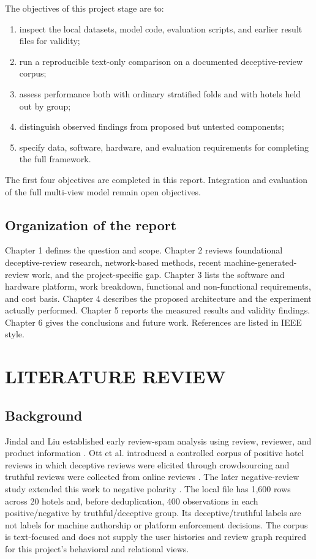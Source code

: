\documentclass[12pt,a4paper]{report}
\begin{document}
The objectives of this project stage are to:

\begin{enumerate}
    \item inspect the local datasets, model code, evaluation scripts, and earlier result files for validity;
    \item run a reproducible text-only comparison on a documented deceptive-review corpus;
    \item assess performance both with ordinary stratified folds and with hotels held out by group;
    \item distinguish observed findings from proposed but untested components;
    \item specify data, software, hardware, and evaluation requirements for completing the full framework.
\end{enumerate}

The first four objectives are completed in this report. Integration and evaluation of the full multi-view model remain open objectives.

\section{Organization of the report}

Chapter 1 defines the question and scope. Chapter 2 reviews foundational deceptive-review research, network-based methods, recent machine-generated-review work, and the project-specific gap. Chapter 3 lists the software and hardware platform, work breakdown, functional and non-functional requirements, and cost basis. Chapter 4 describes the proposed architecture and the experiment actually performed. Chapter 5 reports the measured results and validity findings. Chapter 6 gives the conclusions and future work. References are listed in IEEE style.

\chapter{LITERATURE REVIEW}

\section{Background}

Jindal and Liu established early review-spam analysis using review, reviewer, and product information \cite{jindal2008}. Ott et al. introduced a controlled corpus of positive hotel reviews in which deceptive reviews were elicited through crowdsourcing and truthful reviews were collected from online reviews \cite{ott2011}. The later negative-review study extended this work to negative polarity \cite{ott2013}. The local file has 1,600 rows across 20 hotels and, before deduplication, 400 observations in each positive/negative by truthful/deceptive group. Its deceptive/truthful labels are not labels for machine authorship or platform enforcement decisions. The corpus is text-focused and does not supply the user histories and review graph required for this project's behavioral and relational views.
\end{document}
